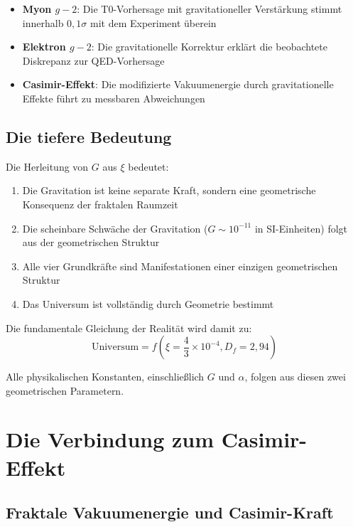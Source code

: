 \documentclass[12pt,a4paper]{article}
\theoremstyle{definition}
\begin{document}
	\begin{itemize}
		\item \textbf{Myon $g-2$}: Die T0-Vorhersage mit gravitationeller Verstärkung stimmt innerhalb $0{,}1\sigma$ mit dem Experiment überein
		\item \textbf{Elektron $g-2$}: Die gravitationelle Korrektur erklärt die beobachtete Diskrepanz zur QED-Vorhersage
		\item \textbf{Casimir-Effekt}: Die modifizierte Vakuumenergie durch gravitationelle Effekte führt zu messbaren Abweichungen
	\end{itemize}
	
	\subsection{Die tiefere Bedeutung}
	
	Die Herleitung von $G$ aus $\xi$ bedeutet:
	
	\begin{enumerate}
		\item Die Gravitation ist keine separate Kraft, sondern eine geometrische Konsequenz der fraktalen Raumzeit
		\item Die scheinbare Schwäche der Gravitation ($G \sim 10^{-11}$ in SI-Einheiten) folgt aus der geometrischen Struktur
		\item Alle vier Grundkräfte sind Manifestationen einer einzigen geometrischen Struktur
		\item Das Universum ist vollständig durch Geometrie bestimmt
	\end{enumerate}
	
	Die fundamentale Gleichung der Realität wird damit zu:
	\begin{equation}
		\boxed{\text{Universum} = f\left(\xi = \frac{4}{3} \times 10^{-4}, D_f = 2{,}94\right)}
	\end{equation}
	
	Alle physikalischen Konstanten, einschließlich $G$ und $\alpha$, folgen aus diesen zwei geometrischen Parametern.
	
	\section{Die Verbindung zum Casimir-Effekt}
	
	\subsection{Fraktale Vakuumenergie und Casimir-Kraft}
	
\end{document}
